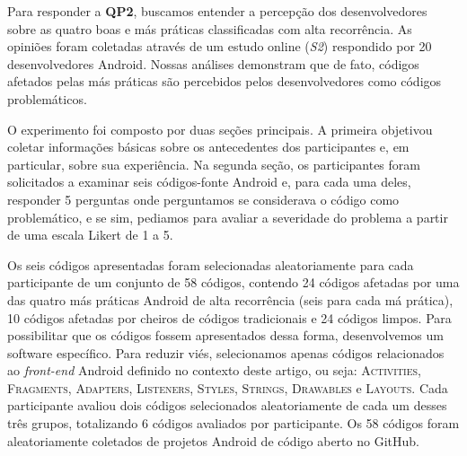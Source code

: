 Para responder a \textbf{QP2}, buscamos entender a percepção dos desenvolvedores sobre as quatro boas e más práticas classificadas com alta recorrência. As opiniões foram coletadas através de um estudo online (\textit{S2}) respondido por 20 desenvolvedores Android. Nossas análises demonstram que de fato, códigos afetados pelas más práticas são percebidos pelos desenvolvedores como códigos problemáticos.



O experimento foi composto por duas seções principais. A primeira objetivou coletar informações básicas sobre os antecedentes dos participantes e, em particular, sobre sua experiência. Na segunda seção, os participantes foram solicitados a examinar seis códigos-fonte Android e, para cada uma deles, responder 5 perguntas onde perguntamos se considerava o código como problemático, e se sim, pediamos para avaliar a severidade do problema a partir de uma escala Likert de 1 a 5.






Os seis códigos apresentadas foram selecionadas aleatoriamente para cada participante de um conjunto de 58 códigos, contendo 24 códigos afetadas por uma das quatro más práticas Android de alta recorrência (seis para cada má prática), 10 códigos afetadas por cheiros de códigos tradicionais e 24 códigos limpos. Para possibilitar que os códigos fossem apresentados dessa forma, desenvolvemos um software específico. Para reduzir viés, selecionamos apenas códigos relacionados ao \textit{front-end} Android definido no contexto deste artigo, ou seja: \textsc{Activities}, \textsc{Fragments}, \textsc{Adapters}, \textsc{Listeners}, \textsc{Styles}, \textsc{Strings}, \textsc{Drawables} e \textsc{Layouts}. Cada participante avaliou dois códigos selecionados aleatoriamente de cada um desses três grupos, totalizando 6 códigos avaliados por participante. Os 58 códigos foram aleatoriamente coletados de projetos Android de código aberto no GitHub.

